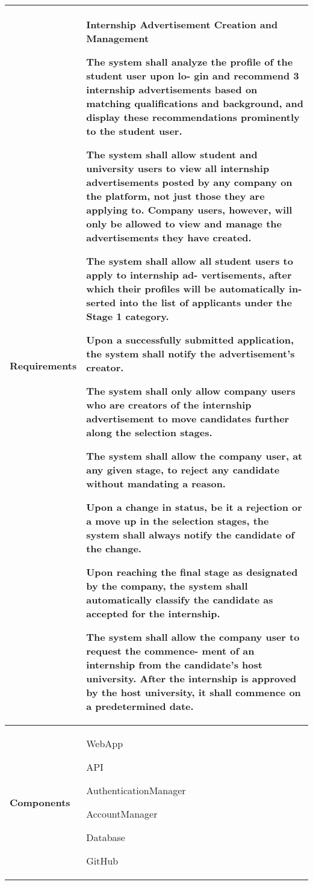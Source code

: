 \begin{table}[ht]
    \centering
    \renewcommand{\arraystretch}{1.5} %
    \begin{tabular}{|C{0.3\textwidth}|L{0.65\textwidth}|} %
        \hline
        \textbf{Requirements} & 
        \textbf{Internship Advertisement Creation and Management} \par
        [FR26] The system shall analyze the profile of the student user upon lo-
        gin and recommend 3 internship advertisements based on matching
        qualifications and background, and display these recommendations
        prominently to the student user. \par
        [FR27] The system shall allow student and university users to view all
        internship advertisements posted by any company on the platform,
        not just those they are applying to. Company users, however, will
        only be allowed to view and manage the advertisements they have
        created. \par
        [FR28] The system shall allow all student users to apply to internship ad-
        vertisements, after which their profiles will be automatically in-
        serted into the list of applicants under the Stage 1 category. \par
        [FR29] Upon a successfully submitted application, the system shall notify
        the advertisement’s creator. \par
        [FR30] The system shall only allow company users who are creators of
        the internship advertisement to move candidates further along the
        selection stages. \par
        [FR31] The system shall allow the company user, at any given stage, to
        reject any candidate without mandating a reason. \par
        [FR32] Upon a change in status, be it a rejection or a move up in the
        selection stages, the system shall always notify the candidate of the
        change. \par
        [FR33] Upon reaching the final stage as designated by the company, the
        system shall automatically classify the candidate as accepted for
        the internship. \par
        [FR34] The system shall allow the company user to request the commence-
        ment of an internship from the candidate’s host university. After
        the internship is approved by the host university, it shall commence
        on a predetermined date. \\
        \hline
        \textbf{Components} & 
        WebApp \par
        API \par
        AuthenticationManager \par
        AccountManager \par
        Database \par
        GitHub \\
        \hline
    \end{tabular}
\end{table}


